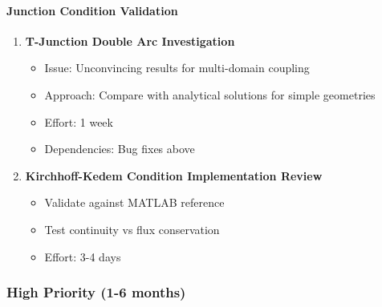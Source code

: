\paragraph{Junction Condition Validation}
\begin{enumerate}
    \item \textbf{T-Junction Double Arc Investigation}
    \begin{itemize}
        \item Issue: Unconvincing results for multi-domain coupling
        \item Approach: Compare with analytical solutions for simple geometries
        \item Effort: 1 week
        \item Dependencies: Bug fixes above
    \end{itemize}
    
    \item \textbf{Kirchhoff-Kedem Condition Implementation Review}
    \begin{itemize}
        \item Validate against MATLAB reference
        \item Test continuity vs flux conservation
        \item Effort: 3-4 days
    \end{itemize}
\end{enumerate}

\subsubsection{High Priority (1-6 months)}

